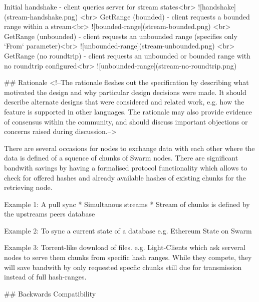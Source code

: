 Initial handshake - client queries server for stream states<br>
![handshake](stream-handshake.png)
<br>
GetRange (bounded) - client requests a bounded range within a stream<br>
![bounded-range](stream-bounded.png)
<br>
GetRange (unbounded) - client requests an unbounded range (specifies only `From` parameter)<br>
![unbounded-range](stream-unbounded.png)
<br>
GetRange (no roundtrip) - client requests an unbounded or bounded range with no roundtrip configured<br>
![unbounded-range](stream-no-roundtrip.png)

## Rationale
<!--The rationale fleshes out the specification by describing what motivated the design and why particular design decisions were made. It should describe alternate designs that were considered and related work, e.g. how the feature is supported in other languages. The rationale may also provide evidence of consensus within the community, and should discuss important objections or concerns raised during discussion.-->

There are several occasions for nodes to exchange data with each other where the data is defined of a squence of chunks of Swarm nodes. There are significant bandwith savings by having a formalised protocol functionality which allows to check for offered hashes and already available hashes of existing chunks for the retrieving node.

Example 1: 
A pull sync
 * Simultanous streams
 * Stream of chunks is defined by the upstreams peers database

Example 2:
To sync a current state of a database e.g. Ethereum State on Swarm

Example 3:
Torrent-like download of files. e.g. Light-Clients which ask serveral nodes to serve them chunks from specific hash ranges.
While they compete, they will save bandwith by only requested specfic chunks still due for transmission instead of full hash-ranges.

## Backwards Compatibility